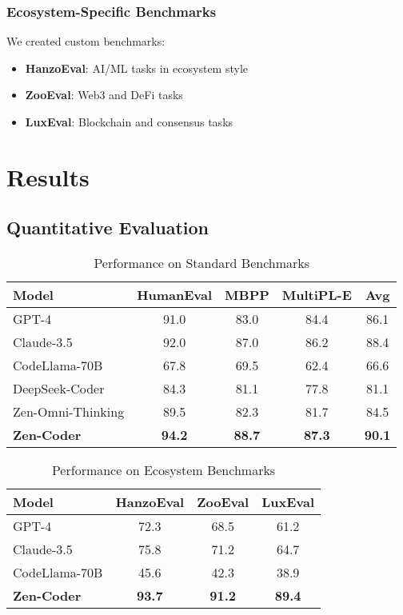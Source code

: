 \documentclass[11pt,a4paper]{article}
\begin{document}
\subsubsection{Ecosystem-Specific Benchmarks}
We created custom benchmarks:
\begin{itemize}
    \item \textbf{HanzoEval}: AI/ML tasks in ecosystem style
    \item \textbf{ZooEval}: Web3 and DeFi tasks
    \item \textbf{LuxEval}: Blockchain and consensus tasks
\end{itemize}

\section{Results}

\subsection{Quantitative Evaluation}

\begin{table}[h]
\centering
\caption{Performance on Standard Benchmarks}
\begin{tabular}{lcccc}
\toprule
Model & HumanEval & MBPP & MultiPL-E & Avg \\
\midrule
GPT-4 & 91.0 & 83.0 & 84.4 & 86.1 \\
Claude-3.5 & 92.0 & 87.0 & 86.2 & 88.4 \\
CodeLlama-70B & 67.8 & 69.5 & 62.4 & 66.6 \\
DeepSeek-Coder & 84.3 & 81.1 & 77.8 & 81.1 \\
\midrule
Zen-Omni-Thinking & 89.5 & 82.3 & 81.7 & 84.5 \\
\textbf{Zen-Coder} & \textbf{94.2} & \textbf{88.7} & \textbf{87.3} & \textbf{90.1} \\
\bottomrule
\end{tabular}
\end{table}

\begin{table}[h]
\centering
\caption{Performance on Ecosystem Benchmarks}
\begin{tabular}{lccc}
\toprule
Model & HanzoEval & ZooEval & LuxEval \\
\midrule
GPT-4 & 72.3 & 68.5 & 61.2 \\
Claude-3.5 & 75.8 & 71.2 & 64.7 \\
CodeLlama-70B & 45.6 & 42.3 & 38.9 \\
\midrule
\textbf{Zen-Coder} & \textbf{93.7} & \textbf{91.2} & \textbf{89.4} \\
\bottomrule
\end{tabular}
\end{table}
\end{document}
